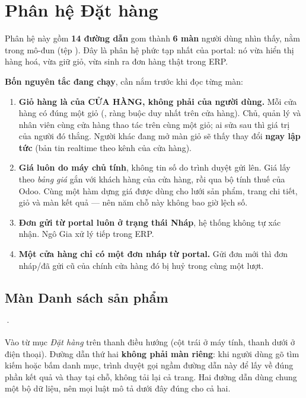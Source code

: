 \chapter{Phân hệ Đặt hàng}

Phân hệ này gồm \textbf{14 đường dẫn} gom thành \textbf{6 màn} người dùng nhìn thấy, nằm trong
mô-đun  (tệp ). Đây là phân hệ phức tạp nhất của
portal: nó vừa hiển thị hàng hoá, vừa giữ giỏ, vừa sinh ra đơn hàng thật trong ERP.

\textbf{Bốn nguyên tắc đang chạy}, cần nắm trước khi đọc từng màn:

\begin{enumerate}[leftmargin=*]
  \item \textbf{Giỏ hàng là của CỬA HÀNG, không phải của người dùng.} Mỗi cửa hàng có đúng một
        giỏ (, ràng buộc duy nhất trên cửa hàng). Chủ, quản lý và nhân
        viên cùng cửa hàng thao tác trên cùng một giỏ; ai sửa sau thì giá trị của người đó
        thắng. Người khác đang mở màn giỏ sẽ thấy thay đổi \textbf{ngay lập tức} (bản tin
        realtime theo kênh của cửa hàng).
  \item \textbf{Giá luôn do máy chủ tính}, không tin số do trình duyệt gửi lên. Giá lấy theo
        \emph{bảng giá} gắn với khách hàng của cửa hàng, rồi qua bộ tính thuế của Odoo. Cùng một
        hàm dựng giá được dùng cho lưới sản phẩm, trang chi tiết, giỏ và màn kết quả --- nên
        năm chỗ này không bao giờ lệch số.
  \item \textbf{Đơn gửi từ portal luôn ở trạng thái Nháp}, hệ thống không tự xác nhận. Ngô Gia
        xử lý tiếp trong ERP.
  \item \textbf{Một cửa hàng chỉ có một đơn nháp từ portal.} Gửi đơn mới thì đơn nháp/đã gửi cũ
        của chính cửa hàng đó bị huỷ trong cùng một lượt.
\end{enumerate}

\section{Màn Danh sách sản phẩm}
 · 
\medskip

\mvao

Vào từ mục \emph{Đặt hàng} trên thanh điều hướng (cột trái ở máy tính, thanh dưới ở điện thoại).
Đường dẫn thứ hai  \textbf{không phải màn riêng}: khi người dùng gõ
tìm kiếm hoặc bấm danh mục, trình duyệt gọi ngầm đường dẫn này để lấy về đúng phần kết quả và
thay tại chỗ, không tải lại cả trang. Hai đường dẫn dùng chung một bộ dữ liệu, nên mọi luật mô
tả dưới đây đúng cho cả hai.

